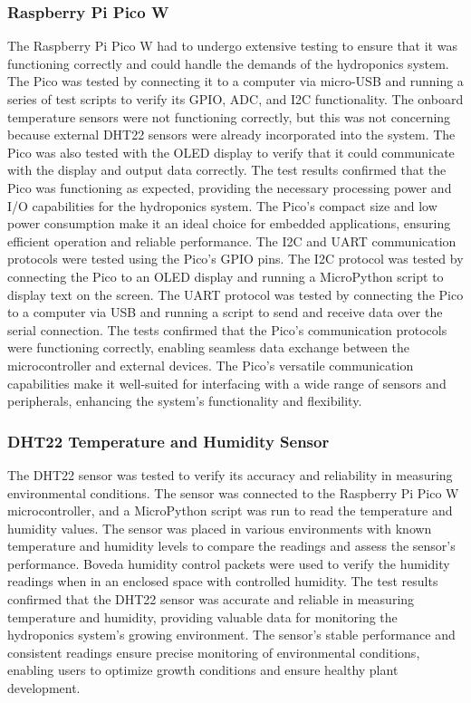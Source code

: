 \documentclass[12pt]{article} %
\begin{document}
\subsubsection{Raspberry Pi Pico W}
\noindent The Raspberry Pi Pico W \cite{ref_pico_w} had to undergo extensive testing to ensure that it was functioning correctly and could handle the demands of the hydroponics system. The Pico was tested by connecting it to a computer via micro-USB and running a series of test scripts to verify its GPIO, ADC, and I2C functionality. The onboard temperature sensors were not functioning correctly, but this was not concerning because external DHT22 sensors were already incorporated into the system. The Pico was also tested with the OLED display to verify that it could communicate with the display and output data correctly. The test results confirmed that the Pico was functioning as expected, providing the necessary processing power and I/O capabilities for the hydroponics system. The Pico's compact size and low power consumption make it an ideal choice for embedded applications, ensuring efficient operation and reliable performance.
\newline
\newline
\noindent The I2C and UART communication protocols were tested using the Pico's GPIO pins. The I2C protocol was tested by connecting the Pico to an OLED display and running a MicroPython script to display text on the screen. The UART protocol was tested by connecting the Pico to a computer via USB and running a script to send and receive data over the serial connection. The tests confirmed that the Pico's communication protocols were functioning correctly, enabling seamless data exchange between the microcontroller and external devices. The Pico's versatile communication capabilities make it well-suited for interfacing with a wide range of sensors and peripherals, enhancing the system's functionality and flexibility.
\subsubsection{DHT22 Temperature and Humidity Sensor}
\noindent The DHT22 sensor was tested to verify its accuracy and reliability in measuring environmental conditions. The sensor was connected to the Raspberry Pi Pico W microcontroller, and a MicroPython script was run to read the temperature and humidity values. The sensor was placed in various environments with known temperature and humidity levels to compare the readings and assess the sensor's performance. Boveda humidity control packets \cite{ref_boveda} were used to verify the humidity readings when in an enclosed space with controlled humidity. The test results confirmed that the DHT22 sensor was accurate and reliable in measuring temperature and humidity, providing valuable data for monitoring the hydroponics system's growing environment. The sensor's stable performance and consistent readings ensure precise monitoring of environmental conditions, enabling users to optimize growth conditions and ensure healthy plant development.
\end{document}
